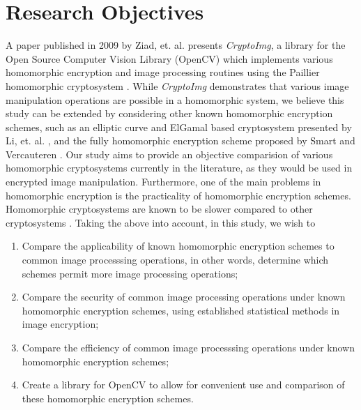 \section{Research Objectives}

A paper published in 2009 by Ziad, et. al. presents \textit{CryptoImg}, a library for the  Open Source Computer Vision Library (OpenCV) \cite{opencv_library} which implements various homomorphic encryption and image processing routines using the Paillier homomorphic cryptosystem \cite{ziad_cryptoimg:_2016}. While \textit{CryptoImg} demonstrates that various image manipulation operations are possible in a homomorphic system, we believe this study can be extended by considering other known homomorphic encryption schemes, such as an elliptic curve and ElGamal based cryptosystem presented by Li, et. al. \cite{li_elliptic_2012}, and the fully homomorphic encryption scheme proposed by Smart and Vercauteren \cite{hutchison_fully_2010}. Our study aims to provide an objective comparision of various homomorphic cryptosystems currently in the literature, as they would be used in encrypted image manipulation.
Furthermore, one of the main problems in homomorphic encryption is the practicality of homomorphic encryption schemes. Homomorphic cryptosystems are known to be slower compared to other cryptosystems \cite{sen_homomorphic_2013}.
Taking the above into account, in this study, we wish to
\begin{enumerate}
    \item Compare the applicability of known homomorphic encryption schemes to common image processsing operations, in other words, determine which schemes permit more image processing operations;
		\item Compare the security of common image processing operations under known homomorphic encryption schemes, using established statistical methods in image encryption;
    \item Compare the efficiency of common image processsing operations under known homomorphic encryption schemes;
    \item Create a library for OpenCV to allow for convenient use and comparison of these homomorphic encryption schemes.
\end{enumerate}
